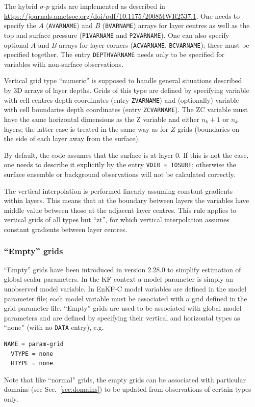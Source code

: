 \documentclass[11pt]{report}
\begin{document}
The hybrid $\sigma$-$p$ grids are implemented as described in \url{https://journals.ametsoc.org/doi/pdf/10.1175/2008MWR2537.1}.
One needs to specify the $A$ (\verb|AVARNAME|) and $B$ (\verb|BVARNAME|) arrays for layer centres as well as the top and surface pressure (\verb|P1VARNAME| and \verb|P2VARNAME|).
One can also specify optional $A$ and $B$ arrays for layer corners (\verb|ACVARNAME|, \verb|BCVARNAME|); these must be specified together.
The entry \verb|DEPTHVARNAME| needs only to be specified for variables with non-surface observations.

Vertical grid type ``numeric'' is supposed to handle general situations described by 3D arrays of layer depths.
Grids of this type are defined by specifying variable with cell centres depth coordinates (entry \verb|ZVARNAME|) and (optionally) variable with cell boundaries depth coordinates (entry \verb|ZCVARNAME|).
The ZC variable must have the same horizontal dimensions as the Z variable and either $n_k + 1$ or $n_k$ layers; the latter case is treated in the same way as for $Z$ grids (boundaries on the side of each layer away from the surface).

By default, the code assumes that the surface is at layer 0.
If this is not the case, one needs to describe it explicitly by the entry \verb|VDIR = TOSURF|; otherwise the surface ensemble or background observations will not be calculated correctly.

The vertical interpolation is performed linearly assuming constant gradients within layers.
This means that at the boundary between layers the variables have middle value between those at the adjacent layer centres.
This rule applies to vertical grids of all types but ``zt'', for which vertical interpolation assumes constant gradients between layer centres.

\subsubsection{``Empty'' grids}

``Empty'' grids have been introduced in version 2.28.0 to simplify estimation of global scalar parameters.
In the KF context a model parameter is simply an unobserved model variable.
In EnKF-C model variables are defined in the model parameter file; each model variable must be associated with a grid defined in the grid parameter file.
``Empty'' grids are used to be associated with global model parameters and are defined by specifying their vertical and horizontal types as ``none'' (with no \verb|DATA| entry), e.g.
\begin{Verbatim}[frame=single,fontsize=\footnotesize]
  NAME = param-grid
  VTYPE = none
  HTYPE = none
\end{Verbatim}
Note that like ``normal'' grids, the empty grids can be associated with particular domains (see Sec.~\ref{sec:domains}) to be updated from observations of certain types only.
\end{document}
